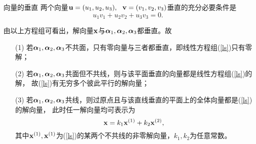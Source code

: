 \begin{frame}
  \begin{footnotesize}
    \begin{block}{向量的垂直}
      两个向量$\mathbf{u}=(u_1,u_2,u_3), ~~\mathbf{v}=(v_1,v_2,v_3)$垂直的充分必要条件是
      $$
      u_1v_1+u_2v_2+u_3v_3=0.
      $$
    \end{block}
    \pause

    由以上方程组可看出，解向量$\mathbf{x}$与$\boldsymbol{\alpha}_1,\boldsymbol{\alpha}_2,\boldsymbol{\alpha}_3$都垂直。\pause 故
    \begin{itemize}
    \item[(1)] 若$\boldsymbol{\alpha}_1,\boldsymbol{\alpha}_2,\boldsymbol{\alpha}_3$不共面，只有零向量与三者都垂直，即线性方程组(\ref{ls})只有零解；\\[0.1in] \pause
    \item[(2)] 若$\boldsymbol{\alpha}_1,\boldsymbol{\alpha}_2,\boldsymbol{\alpha}_3$共面但不共线，则与该平面垂直的向量都是线性方程组(\ref{ls})的解，
      故(\ref{ls})有无穷多个彼此平行的解向量；\\[0.1in] \pause
    \item[(3)] 若$\boldsymbol{\alpha}_1,\boldsymbol{\alpha}_2,\boldsymbol{\alpha}_3$共线，则过原点且与该直线垂直的平面上的全体向量都是(\ref{ls})的解向量，
      此时任一解向量均可表示为
      $$
      \mathbf{x} = k_1 \mathbf{x}^{(1)} + k_2 \mathbf{x}^{(2)},
      $$
      其中$\mathbf{x}^{(1)}, \mathbf{x}^{(1)}$为(\ref{ls})的某两个不共线的非零解向量，$k_1,k_2$为任意常数。
    \end{itemize}
  \end{footnotesize}
\end{frame}

